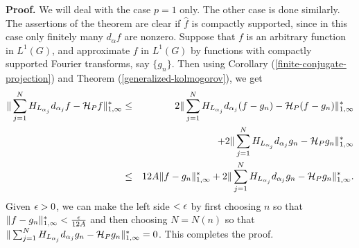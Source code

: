 {\bf Proof.} 
We will
deal with the case $p=1$ only.
The other case is done similarly.
The assertions of the theorem
are clear if $\hat{f}$ is compactly supported,
since in this case only finitely many $d_\alpha f$
are nonzero.
Suppose that $f$ is an arbitrary function
in $L^1 (G)$, and   
 approximate $f$
in $L^1(G)$ by
functions with compactly supported Fourier transforms,
say $\{g_n\}$.  Then using 
Corollary (\ref{finite-conjugate-projection}) 
and Theorem (\ref{generalized-kolmogorov}),
we get
\begin{eqnarray*}
\| \sum_{j=1}^N H_{L_{\alpha_j}} d_{\alpha_j} f -{\cal H}_P f\|^*_{1,\infty}
& \leq &
2 \| \sum_{j=1}^N H_{L_{\alpha_j}} d_{\alpha_j} (f-g_n) -
{\cal H}_P (f-g_n)\|^*_{1,\infty} \\
& & + 
2 \| \sum_{j=1}^N H_{L_{\alpha_j}} d_{\alpha_j} g_n -{\cal H}_P g_n\|^*_{1,\infty}\\
& \leq&
12 A \| f-g_n\|^*_{1,\infty} +
2 \| \sum_{j=1}^N H_{L_{\alpha_j}} d_{\alpha_j} g_n -{\cal H}_P g_n\|^*_{1,\infty}.
\end{eqnarray*}
Given $\epsilon >0$, we can make the left side $<\epsilon$
by first choosing $n$ so that
$\| f-g_n\|^*_{1,\infty}<\frac{\epsilon}{12 A}$ and
then choosing $N=N(n)$ so that 
$\| \sum_{j=1}^N H_{L_{\alpha_j}} d_{\alpha_j} g_n -
{\cal H}_P g_n\|^*_{1,\infty}=0$.  
This completes the proof.\\

